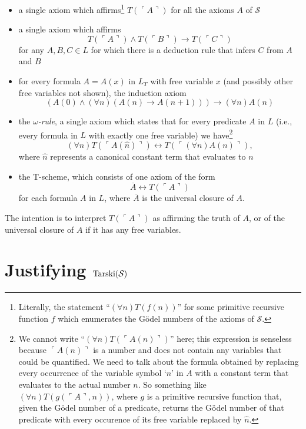 \documentclass{amsart}
\begin{document}
\begin{itemize}
\item a single axiom which affirms\footnote{Literally, the statement
``$(\forall n)T(f(n))$'' for some primitive recursive function $f$ which enumerates the G\"odel
numbers of the axioms of $\mathcal{S}$.}
$T(\ulcorner A\urcorner)$ for all the axioms $A$ of $\mathcal{S}$

\item a single axiom which affirms
$$T(\ulcorner A\urcorner) \wedge T(\ulcorner B\urcorner) \to T(\ulcorner C\urcorner)$$
for any $A,B,C \in L$ for which there is a deduction rule that infers $C$ from $A$ and $B$

\item for every formula $A = A(x)$ in $L_T$ with free variable $x$
(and possibly other free variables not shown), the induction axiom
$$(A(0) \wedge (\forall n)(A(n) \to A(n+1))) \to (\forall n) A(n)$$

\item the {\it $\omega$-rule}, a single axiom which states that for every predicate $A$ in $L$
(i.e., every formula in $L$ with exactly one free variable) we have\footnote{We cannot write
``$(\forall n)T(\ulcorner A(n)\urcorner)$'' here; this expression is senseless because
$\ulcorner A(n)\urcorner$ is a number and does not contain any variables that could be
quantified. We need to talk about the formula obtained by replacing
every occurrence of the variable symbol `$n$' in $A$
with a constant term that evaluates to the actual number $n$. So something like
$(\forall n)T(g(\ulcorner A\urcorner, n))$, where $g$ is a primitive recursive function
that, given the G\"odel number of a predicate, returns the G\"odel number of that predicate with every
occurence of its free variable replaced by $\hat{n}$.}
$$(\forall n)T(\ulcorner A(\hat{n})\urcorner) \leftrightarrow
T(\ulcorner (\forall n)A(n)\urcorner),$$
where $\hat{n}$ represents a canonical constant term that evaluates to $n$

\item the T-scheme, which consists of one axiom of the form
$$\overline{A} \leftrightarrow T(\ulcorner A\urcorner)$$
for each formula $A$ in $L$, where $\overline{A}$ is the universal closure of $A$.
\end{itemize}

The intention is to interpret $T(\ulcorner A\urcorner)$ as affirming the truth of $A$, or of the
universal closure of $A$ if it has any free variables.

\section{Justifying ${\rm Tarski}(\mathcal{S})$}
\end{document}
